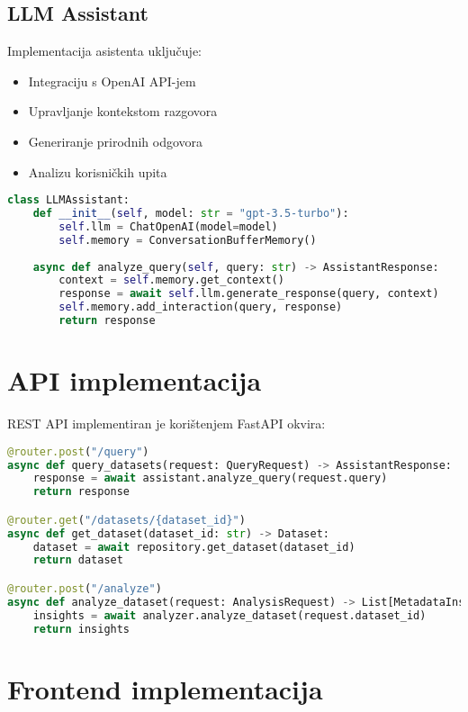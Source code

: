 \subsection{LLM Assistant}
Implementacija asistenta uključuje:
\begin{itemize}
    \item Integraciju s OpenAI API-jem
    \item Upravljanje kontekstom razgovora
    \item Generiranje prirodnih odgovora
    \item Analizu korisničkih upita
\end{itemize}

\begin{lstlisting}[language=Python, caption=Implementacija LLM Asistenta]
class LLMAssistant:
    def __init__(self, model: str = "gpt-3.5-turbo"):
        self.llm = ChatOpenAI(model=model)
        self.memory = ConversationBufferMemory()
    
    async def analyze_query(self, query: str) -> AssistantResponse:
        context = self.memory.get_context()
        response = await self.llm.generate_response(query, context)
        self.memory.add_interaction(query, response)
        return response
\end{lstlisting}

\section{API implementacija}
\label{sec:api}

REST API implementiran je korištenjem FastAPI okvira:

\begin{lstlisting}[language=Python, caption=Implementacija glavnih API endpointa]
@router.post("/query")
async def query_datasets(request: QueryRequest) -> AssistantResponse:
    response = await assistant.analyze_query(request.query)
    return response

@router.get("/datasets/{dataset_id}")
async def get_dataset(dataset_id: str) -> Dataset:
    dataset = await repository.get_dataset(dataset_id)
    return dataset

@router.post("/analyze")
async def analyze_dataset(request: AnalysisRequest) -> List[MetadataInsight]:
    insights = await analyzer.analyze_dataset(request.dataset_id)
    return insights
\end{lstlisting}

\section{Frontend implementacija}
\label{sec:frontend}

